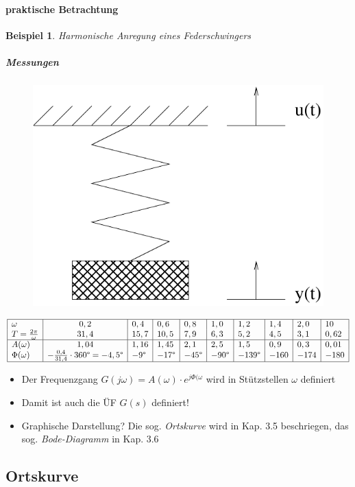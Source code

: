 \message{ !name(Mitschrieb_SysRegel.tex)}\documentclass[12pt,a4paper,ngerman]{scrartcl}
\newtheorem{bsp}{Beispiel}[section] %
\begin{document}
\paragraph{praktische Betrachtung}
\begin{bsp}Harmonische Anregung eines Federschwingers
\end{bsp}
\subparagraph{Messungen}
\begin{figure}[H]
  \centering
  \includegraphics[width=0.4\linewidth]{sysregel_bsp_3-4}
\end{figure}
\begin{align*}
  \begin{array}{|l|c|l|l|l|l|l|l|l|l|}
    \hline
    \omega               &0,2 &0,4 &0,6 &0,8&1,0&1,2&1,4&2,0&10    \\
    T=\frac{2\pi}{\omega}&31,4&15,7&10,5&7,9&6,3&5,2&4,5&3,1&0,62  \\
    \hline
    A(\omega)            &1,04&1,16&1,45&2,1&2,5&1,5&0,9&0,3&0,01  \\
    \Phi(\omega)         &-\frac{0,4}{31,4}\cdot 360\degree =-4,5\degree&-9\degree&-17\degree&-45\degree&-90\degree&-139\degree&-160&-174&-180\\
\hline
  \end{array}
\end{align*}
\begin{itemize}
\item Der Frequenzgang $G(j\omega)=A(\omega)\cdot e^{j\Phi(\omega}$ wird in Stützstellen $\omega$ definiert
\item Damit ist auch die ÜF $G(s)$ definiert!
\item Graphische Darstellung? Die sog. \emph{Ortskurve} wird in Kap. 3.5 beschriegen, das sog. \emph{Bode-Diagramm} in Kap. 3.6
\end{itemize}

\subsection{Ortskurve}
\end{document}
